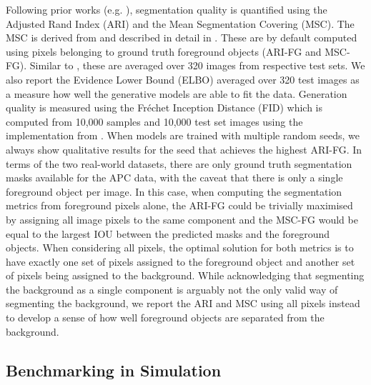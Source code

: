 \documentclass{article}
\begin{document}
Following prior works (e.g. \cite{greff2019multi,engelcke2020genesis,engelcke2020reconstruction,locatello2020object}), segmentation quality is quantified using the Adjusted Rand Index (ARI) \cite{hubert1985comparing} and the Mean Segmentation Covering (MSC).
The MSC is derived from \citet{arbelaez2010contour} and described in detail in \citet{engelcke2020genesis}.
These are by default computed using pixels belonging to ground truth foreground objects (ARI-FG and MSC-FG).
Similar to \citet{greff2019multi}, these are averaged over 320 images from respective test sets.
We also report the Evidence Lower Bound (ELBO) averaged over 320 test images as a measure how well the generative models are able to fit the data.
Generation quality is measured using the Fr\'{e}chet Inception Distance (FID) \cite{heusel2017gans} which is computed from 10,000 samples and 10,000 test set images using the implementation from \citet{Seitzer2020FID}.
When models are trained with multiple random seeds, we always show qualitative results for the seed that achieves the highest ARI-FG.
In terms of the two real-world datasets, there are only ground truth segmentation masks available for the APC data, with the caveat that there is only a single foreground object per image.
In this case, when computing the segmentation metrics from foreground pixels alone, the ARI-FG could be trivially maximised by assigning all image pixels to the same component and the MSC-FG would be equal to the largest IOU between the predicted masks and the foreground objects.
When considering all pixels, the optimal solution for both metrics is to have exactly one set of pixels assigned to the foreground object and another set of pixels being assigned to the background.
While acknowledging that segmenting the background as a single component is arguably not the only valid way of segmenting the background, we report the ARI and MSC using all pixels instead to develop a sense of how well foreground objects are separated from the background.




\subsection{Benchmarking in Simulation}
\end{document}
